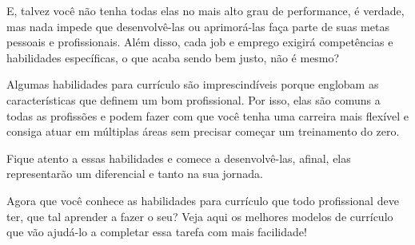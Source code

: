\begin{commentA}
E, talvez você não tenha todas elas no mais alto grau de performance, é verdade, mas nada impede que desenvolvê-las ou aprimorá-las faça parte de suas metas pessoais e profissionais. Além disso, cada job e emprego exigirá competências e habilidades específicas, o que acaba sendo bem justo, não é mesmo?

Algumas habilidades para currículo são imprescindíveis porque englobam as características que definem um bom profissional. Por isso, elas são comuns a todas as profissões e podem fazer com que você tenha uma carreira mais flexível e consiga atuar em múltiplas áreas sem precisar começar um treinamento do zero.

Fique atento a essas habilidades e comece a desenvolvê-las, afinal, elas representarão um diferencial e tanto na sua jornada.

Agora que você conhece as habilidades para currículo que todo profissional deve ter, que tal aprender a fazer o seu? Veja aqui os melhores modelos de currículo que vão ajudá-lo a completar essa tarefa com mais facilidade!

 \par \vspace{0.1cm} \end{commentA}
